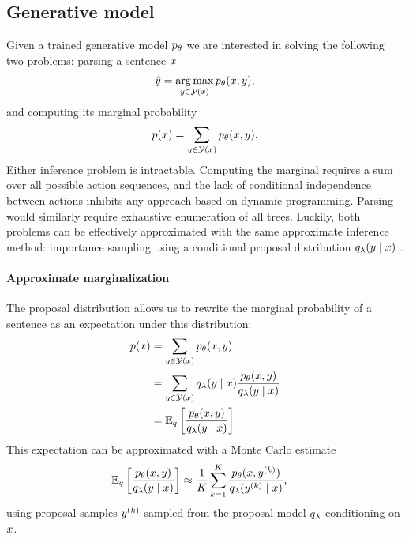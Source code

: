  \subsection{Generative model}
    Given a trained generative model $p_{\theta}$ we are interested in solving the following two problems: parsing a sentence $x$
    \begin{align*}
      \hat{y} = \operatorname*{arg\,max}_{ y \in \mathcal{Y}(x) } p_{\theta}(x, y),
    \end{align*}
    and computing its marginal probability
    \begin{align*}
      p(x) = \sum_{ y \in \mathcal{Y}(x) } p_{\theta}(x, y).
    \end{align*}
    Either inference problem is intractable. Computing the marginal requires a sum over all possible action sequences, and the lack of conditional independence between actions inhibits any approach based on dynamic programming. Parsing would similarly require exhaustive enumeration of all trees. Luckily, both problems can be effectively approximated with the same approximate inference method: importance sampling using a conditional proposal distribution $q_{\lambda}(y \mid x)$ \citep{dyer2016rnng}.

    \paragraph{Approximate marginalization}
      The proposal distribution allows us to rewrite the marginal probability of a sentence as an expectation under this distribution:
      \begin{align*}
        p (x)
          &= \sum_{y  \in \mathcal{Y}(x)} p_{\theta}(x, y) \\
          &= \sum_{y  \in \mathcal{Y}(x)} q_{\lambda}(y \mid x) \frac{p_{\theta}(x,y )}{q_{\lambda}(y \mid x)} \\
          &= \operatorname{\mathbb{E}}_{q} \bigg[\frac{p_{\theta}(x,y )}{q_{\lambda}(y \mid  x)} \bigg] \\
      \end{align*}
      This expectation can be approximated with a Monte Carlo estimate
      \begin{align}
        \operatorname{\mathbb{E}}_{q} \bigg[\frac{p_{\theta}(x, y)}{q_{\lambda}(y \mid x)} \bigg]
          &\approx \frac{1}{K}\sum_{k=1}^K  \frac{p_{\theta}( x, y^{(k)} )}{q_{\lambda}(y^{(k)} \mid x)},
      \end{align}
      using proposal samples $y^{(k)}$ sampled from the proposal model $q_{\lambda}$ conditioning on $x$.


